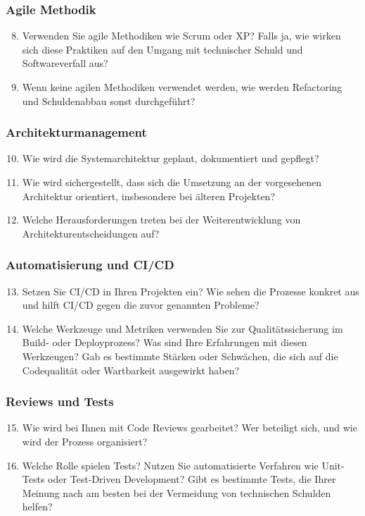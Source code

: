 \subsubsection*{Agile Methodik}
\begin{enumerate}
    \setcounter{enumi}{7}
    \item Verwenden Sie agile Methodiken wie Scrum oder XP? Falls ja, wie wirken sich diese Praktiken auf den Umgang mit technischer Schuld und Softwareverfall aus?
    \item Wenn keine agilen Methodiken verwendet werden, wie werden Refactoring und Schuldenabbau sonst durchgeführt?
\end{enumerate}

\subsubsection*{Architekturmanagement}
\begin{enumerate}
    \setcounter{enumi}{9}
    \item Wie wird die Systemarchitektur geplant, dokumentiert und gepflegt?
    \item Wie wird sichergestellt, dass sich die Umsetzung an der vorgesehenen Architektur orientiert, insbesondere bei älteren Projekten?
    \item Welche Herausforderungen treten bei der Weiterentwicklung von Architekturentscheidungen auf?
\end{enumerate}

\subsubsection*{Automatisierung und CI/CD}
\begin{enumerate}
    \setcounter{enumi}{12}
    \item Setzen Sie CI/CD in Ihren Projekten ein? Wie sehen die Prozesse konkret aus und hilft CI/CD gegen die zuvor genannten Probleme?
    \item Welche Werkzeuge und Metriken verwenden Sie zur Qualitätssicherung im Build- oder Deployprozess? Was sind Ihre Erfahrungen mit diesen Werkzeugen? Gab es bestimmte Stärken oder Schwächen, die sich auf die Codequalität oder Wartbarkeit ausgewirkt haben?
\end{enumerate}

\subsubsection*{Reviews und Tests}
\begin{enumerate}
    \setcounter{enumi}{14}
    \item Wie wird bei Ihnen mit Code Reviews gearbeitet? Wer beteiligt sich, und wie wird der Prozess organisiert?
    \item Welche Rolle spielen Tests? Nutzen Sie automatisierte Verfahren wie Unit-Tests oder Test-Driven Development? Gibt es bestimmte Tests, die Ihrer Meinung nach am besten bei der Vermeidung von technischen Schulden helfen?
\end{enumerate}

